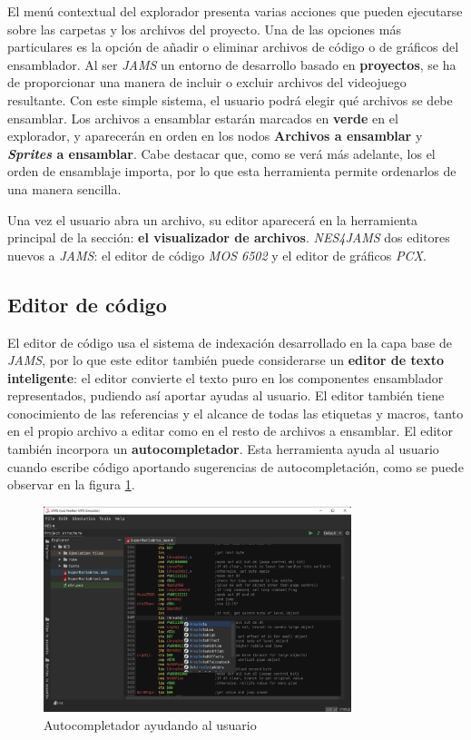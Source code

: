 El menú contextual del explorador presenta varias acciones que
pueden ejecutarse sobre las carpetas y los archivos
del proyecto.
Una de las opciones más particulares es la opción de añadir o eliminar
archivos de código o de gráficos del ensamblador.
Al ser \textit{JAMS} un entorno de desarrollo basado en \textbf{proyectos},
se ha de proporcionar una manera de incluir o excluir archivos del
videojuego resultante.
Con este simple sistema, el usuario podrá elegir qué archivos se debe ensamblar.
Los archivos a ensamblar estarán marcados en \textbf{verde} en el explorador,
y aparecerán en orden en los nodos \textbf{Archivos a ensamblar} y
\textbf{\textit{Sprites} a ensamblar}.
Cabe destacar que, como se verá más adelante, los el orden de ensamblaje
importa, por lo que esta herramienta permite ordenarlos de una manera sencilla.

Una vez el usuario abra un archivo, su editor aparecerá en la herramienta
principal de la sección: \textbf{el visualizador de archivos}.
\textit{NES4JAMS}  dos editores nuevos a \textit{JAMS}:
el editor de código \textit{MOS 6502} y el editor de gráficos \textit{PCX}.

\subsection{Editor de código}\label{subsec:editor-de-codigo}

El editor de código usa el sistema de indexación desarrollado
en la capa base de \textit{JAMS}, por lo que este editor también
puede considerarse un \textbf{editor de texto inteligente}:
el editor convierte el texto puro en los componentes ensamblador
representados, pudiendo así aportar ayudas al usuario.
El editor también tiene conocimiento de las referencias y el alcance de
todas las etiquetas y macros, tanto en el propio archivo a editar
como en el resto de archivos a ensamblar.
El editor también incorpora un \textbf{autocompletador}.
Esta herramienta ayuda al usuario cuando escribe código
aportando sugerencias de autocompletación, como se puede
observar en la figura \ref{fig:nes-autocompletion}.

\begin{figure}[h]
    \centering
    \includegraphics[width=0.8\textwidth]{images/nes/nes-autocompletion}
    \caption{Autocompletador ayudando al usuario}
    \label{fig:nes-autocompletion}
\end{figure}

